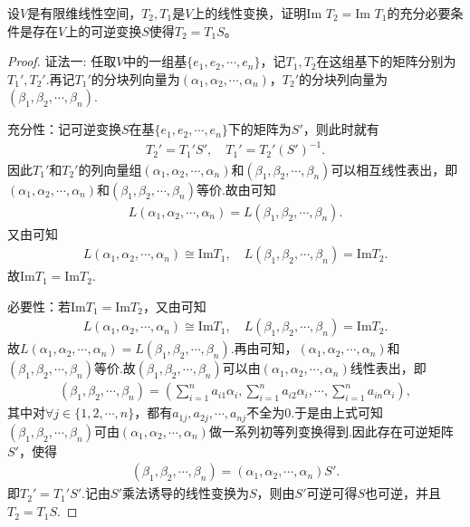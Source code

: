 \documentclass[../../main.tex]{subfiles}
\begin{document}
\begin{proposition}\label{proposition:两个线性变换的值域相等的充要条件}
设\(V\)是有限维线性空间，\(T_2,T_1\)是\(V\)上的线性变换，证明\(\text{Im }T_2 = \text{Im }T_1\)的充分必要条件是存在\(V\)上的可逆变换\(S\)使得\(T_2 = T_1S\)。 
\end{proposition}
\begin{proof}
{\color{blue}证法一:}
任取$V$中的一组基$\{ e_1,e_2,\cdots ,e_n \}$，记$T_1,T_2$在这组基下的矩阵分别为$T_{1}',T_{2}'$.再记$T_{1}'$的分块列向量为$(\alpha _1,\alpha _2,\cdots ,\alpha _n)$，$T_{2}'$的分块列向量为$(\beta _1,\beta _2,\cdots ,\beta _n)$.

充分性：记可逆变换$S$在基$\{ e_1,e_2,\cdots ,e_n \}$下的矩阵为$S'$，则此时就有
\begin{align*}
T_{2}'=T_{1}'S',\quad T_{1}'=T_{2}'(S')^{-1}.
\end{align*}
因此$T_{1}'$和$T_{2}'$的列向量组$(\alpha _1,\alpha _2,\cdots ,\alpha _n)$和$(\beta _1,\beta _2,\cdots ,\beta _n)$可以相互线性表出，即$(\alpha _1,\alpha _2,\cdots ,\alpha _n)$和$(\beta _1,\beta _2,\cdots ,\beta _n)$等价.故由可知
\begin{align*}
L(\alpha _1,\alpha _2,\cdots ,\alpha _n) =L(\beta _1,\beta _2,\cdots ,\beta _n).
\end{align*}
又由可知
\begin{align*}
L(\alpha _1,\alpha _2,\cdots ,\alpha _n) \cong \mathrm{Im}T_1,\quad L(\beta _1,\beta _2,\cdots ,\beta _n) =\mathrm{Im}T_2.
\end{align*}
故$\mathrm{Im}T_1=\mathrm{Im}T_2$.

必要性：若$\mathrm{Im}T_1=\mathrm{Im}T_2$，又由可知
\begin{align*}
L(\alpha _1,\alpha _2,\cdots ,\alpha _n) \cong \mathrm{Im}T_1,\quad L(\beta _1,\beta _2,\cdots ,\beta _n) =\mathrm{Im}T_2.
\end{align*}
故$L(\alpha _1,\alpha _2,\cdots ,\alpha _n) =L(\beta _1,\beta _2,\cdots ,\beta _n)$.再由可知，$(\alpha _1,\alpha _2,\cdots ,\alpha _n)$和$(\beta _1,\beta _2,\cdots ,\beta _n)$等价.故$(\beta _1,\beta _2,\cdots ,\beta _n)$可以由$(\alpha _1,\alpha _2,\cdots ,\alpha _n)$线性表出，即
\begin{align*}
(\beta _1,\beta _2,\cdots ,\beta _n) = \left( \sum_{i=1}^n{a_{i1}\alpha _i},\sum_{i=1}^n{a_{i2}\alpha _i},\cdots ,\sum_{i=1}^n{a_{in}\alpha _i} \right),
\end{align*}
其中对$\forall j\in \{ 1,2,\cdots ,n \}$，都有$a_{1j},a_{2j},\cdots ,a_{nj}$不全为$0$.于是由上式可知$(\beta _1,\beta _2,\cdots ,\beta _n)$可由$(\alpha _1,\alpha _2,\cdots ,\alpha _n)$做一系列初等列变换得到.因此存在可逆矩阵$S'$，使得
\begin{align*}
(\beta _1,\beta _2,\cdots ,\beta _n) = (\alpha _1,\alpha _2,\cdots ,\alpha _n)S'.
\end{align*}
即$T_{2}'=T_{1}'S'$.记由$S'$乘法诱导的线性变换为$S$，则由$S'$可逆可得$S$也可逆，并且$T_2=T_1S$.


\end{proof}
\end{document}
